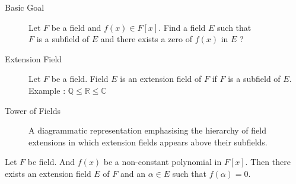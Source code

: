 \begin{description}
	\item[Basic Goal] Let $F$ be a field and $f(x) \in F[x]$.
	Find a field $E$ such that\\
	$F$ is a subfield of $E$ and there exists a zero of $f(x)$ in $E$ ?
	\item[Extension Field] Let $F$ be a field.
	Field $E$ is an extension field of $F$ if $F$ is a subfield of $E$. \\
	Example : $\mathbb{Q} \le \mathbb{R} \le \mathbb{C}$
	\item[Tower of Fields] A diagrammatic representation emphasising the hierarchy of field extensions in which extension fields appears above their subfields.
\end{description}

\begin{theorem}[Kronecker]
	Let $F$ be field.
	And $f(x)$ be a non-constant polynomial in $F[x]$.
	Then there exists an extension field $E$ of $F$ and an $\alpha \in E$ such that $f(\alpha) = 0$.
\end{theorem}
